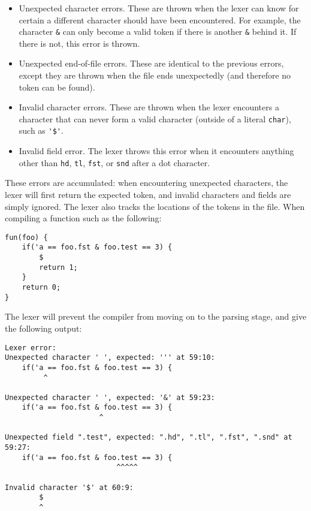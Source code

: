 \begin{itemize}
    \item Unexpected character errors. These are thrown when the lexer can know for certain a different character should have been encountered. For example, the character \lstinline|&| can only become a valid token if there is another \lstinline|&| behind it. If there is not, this error is thrown.
    \item Unexpected end-of-file errors. These are identical to the previous errors, except they are thrown when the file ends unexpectedly (and therefore no token can be found).
    \item Invalid character errors. These are thrown when the lexer encounters a character that can never form a valid character (outside of a literal \lstinline|char|), such as \lstinline|'$'|.
    \item Invalid field error. The lexer throws this error when it encounters anything other than \lstinline|hd|, \lstinline|tl|, \lstinline|fst|, or \lstinline|snd| after a dot character.
\end{itemize}

These errors are accumulated: when encountering unexpected characters, the lexer will first return the expected token, and invalid characters and fields are simply ignored.
The lexer also tracks the locations of the tokens in the file.
When compiling a function such as the following:

\begin{lstlisting}
fun(foo) {
    if('a == foo.fst & foo.test == 3) {
        $
        return 1;
    }
    return 0;
}
\end{lstlisting}

The lexer will prevent the compiler from moving on to the parsing stage, and give the following output:

\begin{lstlisting}[language={}]
Lexer error:
Unexpected character ' ', expected: ''' at 59:10:
    if('a == foo.fst & foo.test == 3) {
         ^

Unexpected character ' ', expected: '&' at 59:23:
    if('a == foo.fst & foo.test == 3) {
                      ^

Unexpected field ".test", expected: ".hd", ".tl", ".fst", ".snd" at 59:27:
    if('a == foo.fst & foo.test == 3) {
                          ^^^^^

Invalid character '$' at 60:9:
        $
        ^
\end{lstlisting}


